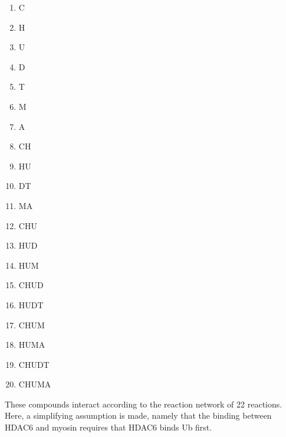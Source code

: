 \begin{multicols}{4}
\begin{enumerate}

\item C     %
\item H                    %
\item U                      %
\item D                     %
\item T         %
\item M                %
\item A              %

\item CH               %
\item HU             %
\item DT    %
\item MA  %

\item CHU                  %
\item HUD                  %
\item HUM              %

\item CHUD         %
\item HUDT     %
\item CHUM          %
\item HUMA   %

\item CHUDT    %
\item CHUMA %

\end{enumerate}
\end{multicols}

These compounds interact according to the reaction network of 22 reactions. Here, a simplifying assumption is made, namely that the binding between HDAC6 and myosin requires that HDAC6 binds Ub first.

